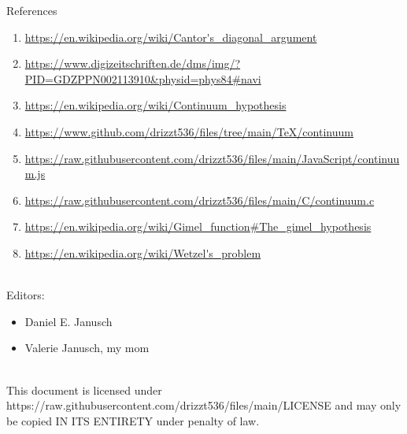 \documentclass[12pt]{article}
\begin{document}
\begin{section}{References}\label{sec:references}
	\begin{enumerate}
		\item\url{https://en.wikipedia.org/wiki/Cantor's\_diagonal\_argument}\\
		\label{ref:diagonal argument}

		\item\url{https://www.digizeitschriften.de/dms/img/?PID=GDZPPN002113910&physid=phys84#navi}\\
		\label{ref:cantor-1891}

		\item\url{https://en.wikipedia.org/wiki/Continuum\_hypothesis}\\
		\label{ref:continuum}

		\item\url{https://www.github.com/drizzt536/files/tree/main/TeX/continuum}\\
		\label{ref:files}

		\item\url{https://raw.githubusercontent.com/drizzt536/files/main/JavaScript/continuum.js}\\
		\label{ref:js-code}

		\item\url{https://raw.githubusercontent.com/drizzt536/files/main/C/continuum.c}\\
		\label{ref:c-code}

		\item\url{https://en.wikipedia.org/wiki/Gimel\_function\#The\_gimel\_hypothesis}\\
		\label{ref:gimel}

		\item\url{https://en.wikipedia.org/wiki/Wetzel's\_problem}\\
		\label{ref:wetzel}
	\end{enumerate}
	\vspace{1em}\\
	Editors:
	\begin{itemize}
		\item Daniel E. Janusch
		\item Valerie Janusch, my mom
	\end{itemize}
	\vspace{3em}\\
	This document is licensed under https://raw.githubusercontent.com/drizzt536/files/main/LICENSE
	and may only be copied IN ITS ENTIRETY under penalty of law.
\end{section}
\end{document}
